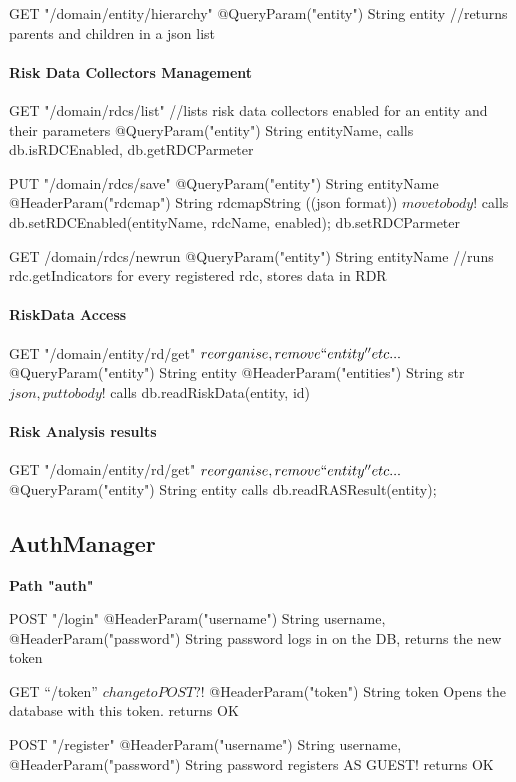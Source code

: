 	GET "/{domain}/entity/hierarchy"
	  @QueryParam("entity") String entity
	  //returns parents and children in a json list
	
\paragraph{Risk Data Collectors Management} 
	  GET "/{domain}/rdcs/list"  //lists risk data collectors enabled for an entity and their parameters
	  @QueryParam("entity") String entityName,
	  calls db.isRDCEnabled, db.getRDCParmeter
	  
   PUT "/{domain}/rdcs/save"
      @QueryParam("entity") String entityName
      @HeaderParam("rdcmap") String rdcmapString  ((json format)) $move to body!$
        calls db.setRDCEnabled(entityName, rdcName, enabled); db.setRDCParmeter
    
    GET /{domain}/rdcs/newrun
	  @QueryParam("entity") String entityName
	  //runs rdc.getIndicators for every registered rdc, stores data in RDR	  
	  
	  
\paragraph{RiskData Access} 
	GET "/{domain}/entity/rd/get" $reorganise, remove ``entity'' etc...$
	  @QueryParam("entity") String entity
	  @HeaderParam("entities") String str  $json, put to body!$
	  calls db.readRiskData(entity, id)
	  
\paragraph{Risk Analysis results} 
	GET "/{domain}/entity/rd/get" $reorganise, remove ``entity'' etc...$
	  @QueryParam("entity") String entity
	  calls db.readRASResult(entity);

\subsection{AuthManager}

\textbf{Path "auth"}

      POST "/login"
	@HeaderParam("username") String username, 
	@HeaderParam("password") String password
	logs in on the DB,
	returns the new token
	
	GET ``/token''  $ change to POST?!$
	@HeaderParam("token") String token
	Opens the database with this token.
	returns OK
	
	POST "/register"
	@HeaderParam("username") String username, 
	@HeaderParam("password") String password
	registers AS GUEST! 
	returns OK
	
